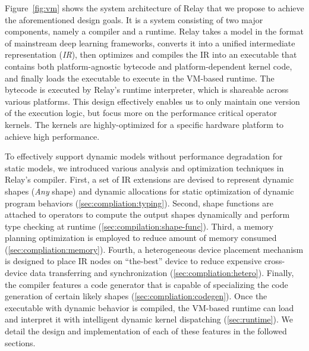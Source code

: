 Figure~\ref{fig:vm} shows the system architecture of Relay that we propose to achieve the aforementioned design goals.
It is a system consisting of two major components, namely a compiler and a runtime.
Relay takes a model in the format of mainstream deep learning frameworks, converts it into a unified intermediate representation (\textit{IR}), then optimizes and compiles the IR into an executable that contains both platform-agnostic bytecode and platform-dependent kernel code, and finally loads the executable to execute in the VM-based runtime.
The bytecode is executed by Relay's runtime interpreter, which is shareable across various platforms.
This design effectively enables us to only maintain one version of the execution logic, but focus more on the performance critical operator kernels.
The kernels are highly-optimized for a specific hardware platform to achieve high performance.

To effectively support dynamic models without performance degradation for static models, we introduced various analysis and optimization techniques in Relay's compiler.
First, a set of IR extensions are devised to represent dynamic shapes (\textit{Any} shape) and dynamic allocations for static optimization of dynamic program behaviors (\autoref{sec:compliation:typing}).
Second, shape functions are attached to operators to compute the output shapes dynamically and perform type checking at runtime (\autoref{sec:compilation:shape-func}).
Third, a memory planning optimization is employed to reduce amount of memory consumed (\autoref{sec:compliation:memory}).
Fourth, a heterogeneous device placement mechanism is designed to place IR nodes on ``the-best'' device to reduce expensive cross-device data transferring and synchronization (\autoref{sec:compliation:hetero}).
Finally, the compiler features a code generator that is capable of specializing the code generation of certain likely shapes (\autoref{sec:compliation:codegen}). Once the executable with dynamic behavior is compiled, the VM-based runtime can load and interpret it with intelligent dynamic kernel dispatching (\autoref{sec:runtime}). We detail the design and implementation of each of these features in the followed sections.


